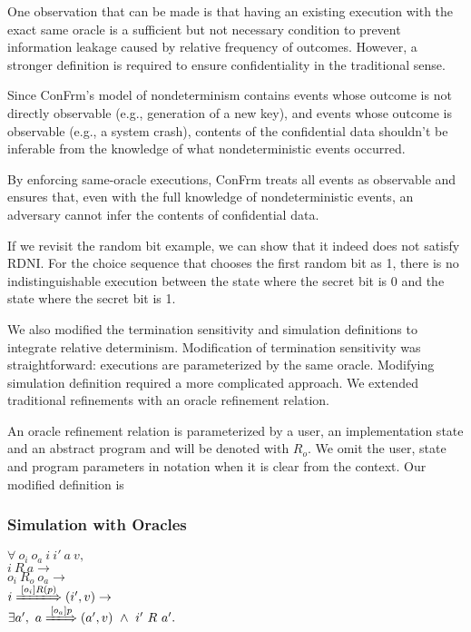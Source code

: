 One observation that can be made is that having an existing execution with the exact same oracle is a sufficient but not necessary condition to prevent information leakage caused by relative frequency of outcomes. However, a stronger definition is required to ensure confidentiality in the traditional sense. 

Since ConFrm’s model of nondeterminism contains events whose outcome is not directly observable (e.g., generation of a new key), and events whose outcome is observable (e.g., a system crash), contents of the confidential data shouldn’t be inferable from the knowledge of what nondeterministic events occurred. 

By enforcing same-oracle executions, ConFrm treats all events as observable and ensures that, even with the full knowledge of nondeterministic events, an adversary cannot infer the contents of confidential data. 

If we revisit the random bit example, we can show that it indeed does not satisfy RDNI. For the choice sequence that chooses the first random bit as 1, there is no indistinguishable execution between the state where the secret bit is 0 and the state where the secret bit is 1.

We also modified the termination sensitivity and simulation definitions to integrate relative determinism. Modification of termination sensitivity was straightforward: executions are parameterized by the same oracle. Modifying simulation definition required a more complicated approach. We extended traditional refinements with an oracle refinement relation.

An oracle refinement relation is parameterized by a user, an implementation state and an abstract program and will be denoted with $R_o$. We omit the user, state and program parameters in notation when it is clear from the context. Our modified definition is
\newpage
\subsubsection*{Simulation with Oracles}
$\forall\ o_i\ o_a\ i\ i'\ a\ v,$\\[2pt]
$i\ R\ a \rightarrow$\\[2pt]
$o_i\ R_o\ o_a \rightarrow$\\[2pt]
$i \xLongrightarrow{[o_i] R(p)} (i', v) \rightarrow$\\[2pt]
$\exists a',\ a \xLongrightarrow{[o_a] p} (a', v)\ \wedge\ i'\ R\ a'.$\\

